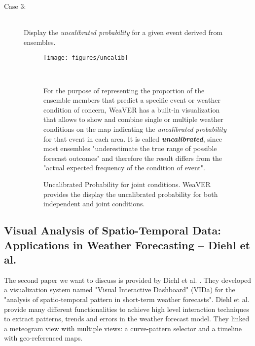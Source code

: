 \documentclass[citeauthoryear]{llncs}
\begin{document}
\begin{description}
	\item[Case 3:] \ \\
	Display the \textit{uncalibrated probability} for a given event derived from ensembles.\\
	
	\begin{figure}[h!]
		\vspace*{-0.9cm}
		\begin{minipage}[t]{7.4cm}
			\vspace{0pt}
			\centering
			\texttt{[image: figures/uncalib]}
			\caption{{\small Uncalibrated Probability for joint conditions. WeaVER provides the display the uncalibrated probability for both independent and joint conditions.}}
			\label{uncalib}
		\end{minipage}
		~
		\begin{minipage}[t]{4.6cm}
		\vspace*{0.03cm}
		For the purpose of representing the proportion of the ensemble members that predict a specific event or weather condition of concern, WeaVER has a built-in visualization that allows to show and combine single or multiple weather conditions on the map indicating the \textit{uncalibrated probability} for that event in each area. It is called \textbf{\textit{uncalibrated}}, since most ensembles "underestimate the true range of possible forecast outcomes" \cite{quinan2016visually} and therefore the result differs from the "actual expected frequency of the condition of event".
		\end{minipage}
		\vspace*{-0.5cm}
	\end{figure}	
\end{description}
\vspace{-0.7cm}
\subsection{Visual Analysis of Spatio-Temporal Data: Applications in Weather Forecasting -- Diehl et al.}

The second paper we want to discuss is provided by Diehl et al. \cite{diehl2015visual}. They developed a visualization system named "Visual Interactive Dashboard" (VIDa) for the "analysis of spatio-temporal pattern in short-term weather forecasts". Diehl et al. provide many different functionalities to achieve high level interaction techniques to extract patterns, trends and errors in the weather forecast model. They linked a meteogram view with multiple views: a curve-pattern selector and a timeline with geo-referenced maps. \\
\end{document}
